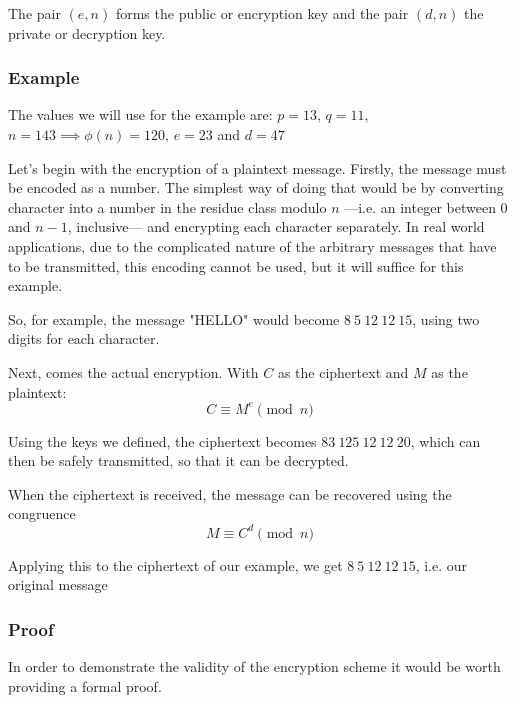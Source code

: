 \documentclass[12pt, titlepage]{article}
\begin{document}
        The pair $(e, n)$ forms the public or encryption key and the pair $(d, n)$ the private
        or decryption key.


        \subsubsection{Example}
        The values we will use for the example are: $p=13$, $q=11$, $n=143 \implies \phi (n) =
        120$, $e = 23$ and $d = 47$

        Let's begin with the encryption of a plaintext message. Firstly, the message must be
        encoded as a number. The simplest way of doing that would be by converting character
        into a number in the residue class modulo $n$ ---i.e. an integer between $0$ and
        $n-1$, inclusive--- and encrypting each character separately.  In real world
        applications, due to the complicated nature of the arbitrary messages that have to
        be transmitted, this encoding cannot be used, but it will suffice for this example.

        So, for example, the message "HELLO" would become $8\ 5\ 12\ 12\ 15$, using two digits
        for each character.

        Next, comes the actual encryption. With $C$ as the ciphertext and $M$ as the plaintext:
        \begin{equation*}
            C \equiv M^{e} \pmod{n}
        \end{equation*}

        Using the keys we defined, the ciphertext becomes $83\ 125\ 12\ 12\ 20$, which can then
        be safely transmitted, so that it can be decrypted.   

        When the ciphertext is received, the message can be recovered using the congruence
        \begin{equation*}
            M \equiv C^{d} \pmod{n}
        \end{equation*}

        Applying this to the ciphertext of our example, we get $8\ 5\ 12\ 12\ 15$, i.e. our
        original message

    
        \subsubsection{Proof}
        In order to demonstrate the validity of the encryption scheme it would be worth
        providing a formal proof. \autocite{so_rsa_proof}
\end{document}
